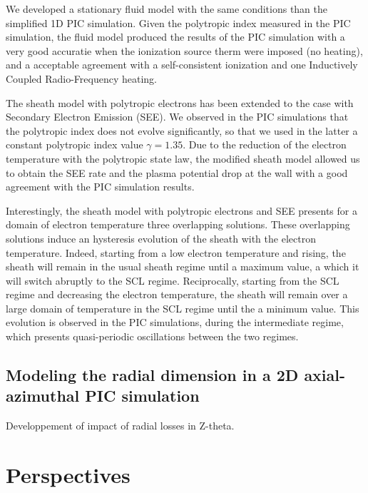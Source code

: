 We developed a stationary fluid model with the same conditions than the simplified 1D PIC simulation.
Given the polytropic index measured in the PIC simulation, the fluid model produced the results of the PIC simulation with a very good accuratie when the ionization source therm were imposed (no heating), and a acceptable agreement with a self-consistent ionization and one Inductively Coupled Radio-Frequency heating.

\vspace{1ex}
The sheath model with polytropic electrons has been extended to the case with Secondary Electron Emission (SEE).
We observed in the PIC simulations that the polytropic index does not evolve significantly, so that we used in the latter a constant polytropic index value $\gamma=1.35$.
Due to the reduction of the electron temperature with the polytropic state law, the modified sheath model allowed us to obtain the SEE rate and the plasma potential drop at the wall with a good agreement with the PIC simulation results.

Interestingly, the sheath model with polytropic electrons and SEE presents for a domain of electron temperature three overlapping solutions.
These overlapping solutions induce an hysteresis evolution of the sheath with the electron temperature.
Indeed, starting from a low electron temperature and rising, the sheath will remain in the usual sheath regime until a maximum value, a which it will switch abruptly to the SCL regime.
Reciprocally, starting from the SCL regime and decreasing the electron temperature, the sheath will remain over a large domain of temperature in the SCL regime until the a minimum value.
This evolution is observed in the PIC simulations, during the intermediate regime, which presents quasi-periodic oscillations between the two regimes. 


\subsection{Modeling the radial dimension in a 2D axial-azimuthal PIC simulation}

Developpement of impact of radial losses in Z-theta.




\section{Perspectives}

